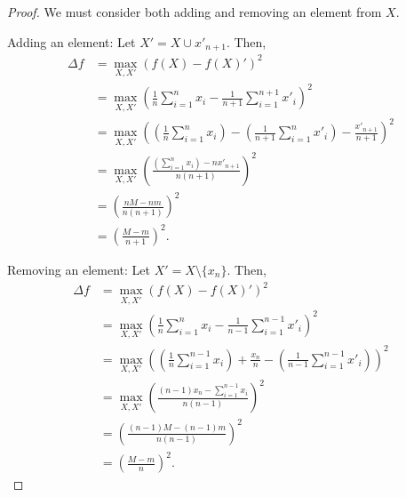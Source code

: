 \documentclass[11pt]{scrartcl} %
\begin{document}
\begin{proof}
	We must consider both adding and removing an element from $X$. \newline

	Adding an element: \newline
	Let $X' = X \cup x'_{n+1}$. Then,
	\begin{align*}
		\Delta f &= \max_{X,X'} (f(X)- f(X)')^2 \\
					   &= \max_{X,X'} \left( \frac{1}{n}\sum_{i=1}^{n}x_i - \frac{1}{n+1}\sum_{i=1}^{n+1}x'_i \right)^2 \\
					   &= \max_{X,X'} \left( \left(\frac{1}{n}\sum_{i=1}^{n}x_i\right) - \left(\frac{1}{n+1}\sum_{i=1}^{n}x'_i\right) - \frac{x'_{n+1}}{n+1} \right)^2 \\
					   &= \max_{X,X'} \left( \frac{ \left(\sum_{i=1}^{n}x_i\right) - nx'_{n+1} }{n(n+1)} \right)^2 \\
					   &= \left( \frac{nM - nm}{n(n+1)} \right)^2 \\
					   &= \left( \frac{M - m}{n+1} \right)^2.
	\end{align*}

	Removing an element: \newline
	Let $X' = X \setminus \{ x_{n} \}$. Then,
	\begin{align*}
		\Delta f &= \max_{X,X'} (f(X)- f(X)')^2 \\
					   &= \max_{X,X'} \left( \frac{1}{n}\sum_{i=1}^{n}x_i - \frac{1}{n-1}\sum_{i=1}^{n-1}x'_i \right)^2 \\
					   &= \max_{X,X'} \left( \left( \frac{1}{n}\sum_{i=1}^{n-1}x_i \right) + \frac{x_n}{n} - \left( \frac{1}{n-1}\sum_{i=1}^{n-1}x'_i \right) \right)^2 \\
					   &= \max_{X,X'} \left( \frac{(n-1)x_n - \sum_{i=1}^{n-1}x_i }{n(n-1)} \right)^2 \\
					   &= \left( \frac{(n-1)M - (n-1)m}{n(n-1)} \right)^2 \\
					   &= \left( \frac{M-m}{n} \right)^2.
	\end{align*}
\end{proof}

% 
% 
\end{document}
